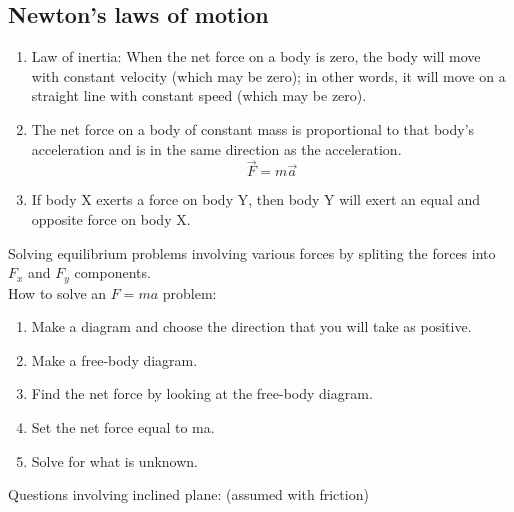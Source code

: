 \documentclass[a4paper,12pt]{article}
\begin{document}
\subsection{Newton's laws of motion}
\begin{enumerate}
  \item Law of inertia: When the net force on a body is zero, the body will move with constant velocity (which may be zero); in other words, it will move on a straight line with constant speed (which may be zero).
  \item The net force on a body of constant mass is proportional to that body's acceleration and is in the same direction as the acceleration.\[\vec{F}=m\vec{a}\]
  \item If body X exerts a force on body Y, then body Y will exert an equal and opposite force on body X.
\end{enumerate}
Solving equilibrium problems involving various forces by spliting the forces into $F_x$ and $F_y$ components.\\
How to solve an $F=ma$ problem:
\begin{enumerate}
  \item Make a diagram and choose the direction that you will take as positive. 
  \item Make a free-body diagram.
  \item Find the net force by looking at the free-body diagram.
  \item Set the net force equal to ma.
  \item Solve for what is unknown.
\end{enumerate}
Questions involving inclined plane: (assumed with friction)
\end{document}
